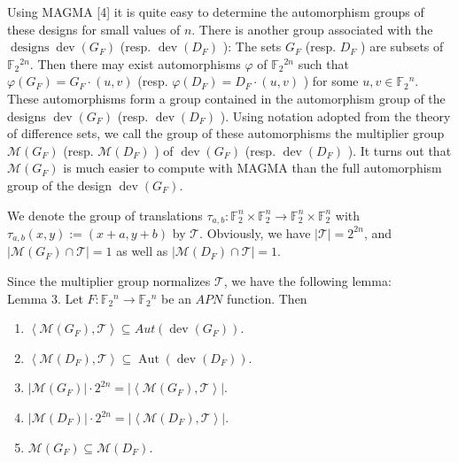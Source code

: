 \documentclass[10pt]{article}
\begin{document}
Using MAGMA [4] it is quite easy to determine the automorphism groups of these designs for small values of $n$. There is another group associated with the $\operatorname{designs} \operatorname{dev}\left(G_{F}\right)$ (resp. $\operatorname{dev}\left(D_{F}\right)$ ): The sets $G_{F}$ (resp. $D_{F}$ ) are subsets of $\mathbb{F}_{2}{ }^{2 n}$. Then there may exist automorphisms $\varphi$ of $\mathbb{F}_{2}{ }^{2 n}$ such that $\varphi\left(G_{F}\right)=G_{F} \cdot(u, v)$ (resp. $\varphi\left(D_{F}\right)=D_{F} \cdot(u, v)$ ) for some $u, v \in \mathbb{F}_{2}{ }^{n}$. These automorphisms form a group contained in the automorphism group of the designs $\operatorname{dev}\left(G_{F}\right)$ (resp. $\operatorname{dev}\left(D_{F}\right)$ ). Using notation adopted from the theory of difference sets, we call the group of these automorphisms the multiplier group $\mathcal{M}\left(G_{F}\right)$ (resp. $\mathcal{M}\left(D_{F}\right)$ ) of $\operatorname{dev}\left(G_{F}\right)$ (resp. $\operatorname{dev}\left(D_{F}\right)$ ). It turns out that $\mathcal{M}\left(G_{F}\right)$ is much easier to compute with MAGMA than the full automorphism group of the design $\operatorname{dev}\left(G_{F}\right)$.

We denote the group of translations $\tau_{a, b}: \mathbb{F}_{2}^{n} \times \mathbb{F}_{2}^{n} \rightarrow \mathbb{F}_{2}^{n} \times \mathbb{F}_{2}^{n}$ with $\tau_{a, b}(x, y):=(x+a, y+b)$ by $\mathcal{T}$. Obviously, we have $|\mathcal{T}|=2^{2 n}$, and $\left|\mathcal{M}\left(G_{F}\right) \cap \mathcal{T}\right|=1$ as well as $\left|\mathcal{M}\left(D_{F}\right) \cap \mathcal{T}\right|=1$.

Since the multiplier group normalizes $\mathcal{T}$, we have the following lemma:\\
Lemma 3. Let $F: \mathbb{F}_{2}{ }^{n} \rightarrow \mathbb{F}_{2}{ }^{n}$ be an $A P N$ function. Then

\begin{enumerate}
  \item $\left\langle\mathcal{M}\left(G_{F}\right), \mathcal{T}\right\rangle \subseteq A u t\left(\operatorname{dev}\left(G_{F}\right)\right)$.
  \item $\left\langle\mathcal{M}\left(D_{F}\right), \mathcal{T}\right\rangle \subseteq \operatorname{Aut}\left(\operatorname{dev}\left(D_{F}\right)\right)$.
  \item $\left|\mathcal{M}\left(G_{F}\right)\right| \cdot 2^{2 n}=\left|\left\langle\mathcal{M}\left(G_{F}\right), \mathcal{T}\right\rangle\right|$.
  \item $\left|\mathcal{M}\left(D_{F}\right)\right| \cdot 2^{2 n}=\left|\left\langle\mathcal{M}\left(D_{F}\right), \mathcal{T}\right\rangle\right|$.
  \item $\mathcal{M}\left(G_{F}\right) \subseteq \mathcal{M}\left(D_{F}\right)$.
\end{enumerate}
\end{document}
